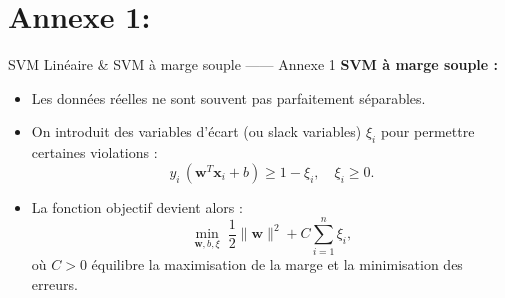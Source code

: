 \documentclass{beamer}
\begin{document}
\section{Annexe 1:}
\begin{frame}{SVM Linéaire \& SVM à marge souple ------ Annexe 1}
    \vspace{1em}
    \textbf{SVM à marge souple :}
    \begin{itemize}
        \item Les données réelles ne sont souvent pas parfaitement séparables.
        \item On introduit des variables d'écart (ou slack variables) \(\xi_i\) pour permettre certaines violations :
        \[
        y_i \, (\mathbf{w}^T\mathbf{x}_i + b) \ge 1 - \xi_i,\quad \xi_i \ge 0.
        \]
        \item La fonction objectif devient alors :
        \[
        \min_{\mathbf{w},b,\xi} \; \frac{1}{2}\|\mathbf{w}\|^2 + C \sum_{i=1}^{n}\xi_i,
        \]
        où \(C > 0\) équilibre la maximisation de la marge et la minimisation des erreurs.
    \end{itemize}
\end{frame}
\end{document}
